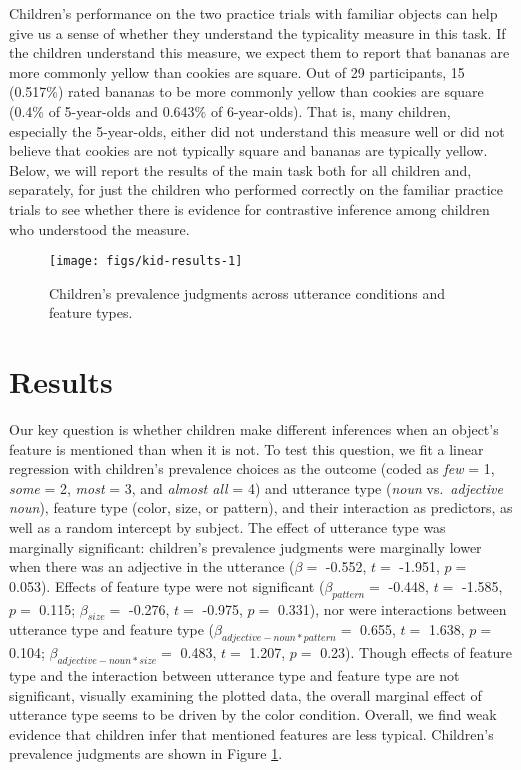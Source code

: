 \documentclass{ucetd}
\begin{document}
Children's performance on the two practice trials with familiar objects
can help give us a sense of whether they understand the typicality
measure in this task. If the children understand this measure, we expect
them to report that bananas are more commonly yellow than cookies are
square. Out of 29 participants, 15 (0.517\%) rated bananas to be more
commonly yellow than cookies are square (0.4\% of 5-year-olds and
0.643\% of 6-year-olds). That is, many children, especially the
5-year-olds, either did not understand this measure well or did not
believe that cookies are not typically square and bananas are typically
yellow. Below, we will report the results of the main task both for all
children and, separately, for just the children who performed correctly
on the familiar practice trials to see whether there is evidence for
contrastive inference among children who understood the measure.

\begin{figure}[!tb]

{\centering \texttt{[image: figs/kid-results-1]} 

}

\caption{Children's prevalence judgments across utterance conditions and feature types.}\label{fig:kid-results}
\end{figure}

\hypertarget{results-4}{%
\section{Results}\label{results-4}}

Our key question is whether children make different inferences when an
object's feature is mentioned than when it is not. To test this
question, we fit a linear regression with children's prevalence choices
as the outcome (coded as \emph{few} = 1, \emph{some} = 2, \emph{most} =
3, and \emph{almost all} = 4) and utterance type (\emph{noun}
vs.~\emph{adjective noun}), feature type (color, size, or pattern), and
their interaction as predictors, as well as a random intercept by
subject. The effect of utterance type was marginally significant:
children's prevalence judgments were marginally lower when there was an
adjective in the utterance (\(\beta =\) -0.552, \(t =\) -1.951, \(p =\)
0.053). Effects of feature type were not significant
(\(\beta_{pattern} =\) -0.448, \(t =\) -1.585, \(p =\) 0.115;
\(\beta_{size} =\) -0.276, \(t =\) -0.975, \(p =\) 0.331), nor were
interactions between utterance type and feature type
(\(\beta_{adjective-noun*pattern} =\) 0.655, \(t =\) 1.638, \(p =\)
0.104; \(\beta_{adjective-noun*size} =\) 0.483, \(t =\) 1.207, \(p =\)
0.23). Though effects of feature type and the interaction between
utterance type and feature type are not significant, visually examining
the plotted data, the overall marginal effect of utterance type seems to
be driven by the color condition. Overall, we find weak evidence that
children infer that mentioned features are less typical. Children's
prevalence judgments are shown in Figure \ref{fig:kid-results}.
\end{document}
